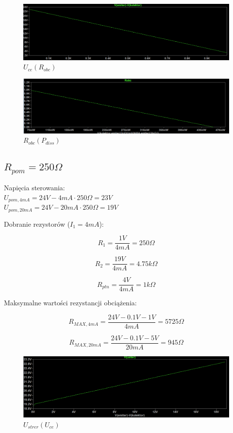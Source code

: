 \documentclass{article}
\begin{document}
\begin{figure}[h!]
    \includegraphics[scale=0.3]{p14.png}
    \centering
    \caption{$U_{ce}(R_{obc})$}
\end{figure}

\begin{figure}[h!]
    \includegraphics[scale=0.3]{p15.png}
    \centering
    \caption{$R_{obc}(P_{diss})$}
\end{figure}

\newpage

\subsection{$R_{pom}=250\Omega$}

Napięcia sterowania:\\
$U_{pom, 4mA}=24V-4mA\cdot 250\Omega=23V$\\
$U_{pom, 20mA}=24V-20mA\cdot 250\Omega=19V$

Dobranie rezystorów ($I_{1}=4mA$):

$$
    R_{1}=\frac{1V}{4mA}=250\Omega
$$

$$
    R_{2}=\frac{19V}{4mA}=4.75k\Omega
$$

$$
    R_{ptn}=\frac{4V}{4mA}=1k\Omega
$$


Maksymalne wartości rezystancji obciążenia:

$$
    R_{MAX, 4mA}=\frac{24V-0.1V-1V}{4mA}=5725\Omega
$$

$$
    R_{MAX, 20mA}=\frac{24V-0.1V-5V}{20mA}=945\Omega
$$


\begin{figure}[h!]
    \includegraphics[scale=0.3]{p16.png}
    \centering
    \caption{$U_{strer}(U_{ce})$}
\end{figure}
\end{document}
